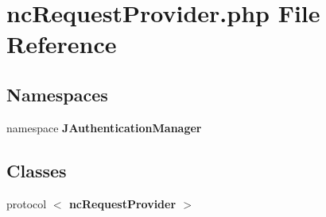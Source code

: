 \section{ncRequestProvider.php File Reference}
\label{ncRequestProvider_8php}
\subsection*{Namespaces}
\begin{CompactItemize}
\item 
namespace {\bf JAuthenticationManager}
\end{CompactItemize}
\subsection*{Classes}
\begin{CompactItemize}
\item 
protocol {\bf $<$ ncRequestProvider $>$}
\end{CompactItemize}
